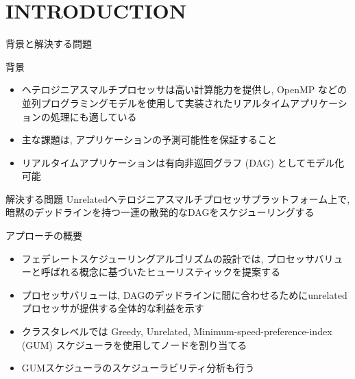 
\section{INTRODUCTION}
\label{sec: introduction}

\begin{frame}{背景と解決する問題}
    \begin{block}{背景}
        \setlength{\linewidth}{0.98\columnwidth}
        \begin{itemize}
            \item ヘテロジニアスマルチプロセッサは高い計算能力を提供し, OpenMP などの並列プログラミングモデルを使用して実装されたリアルタイムアプリケーションの処理にも適している
            \item 主な課題は, アプリケーションの予測可能性を保証すること
            \item リアルタイムアプリケーションは有向非巡回グラフ (DAG) としてモデル化可能
        \end{itemize}
    \end{block}
    \begin{block}{解決する問題}
        Unrelatedヘテロジニアスマルチプロセッサプラットフォーム上で, 暗黙のデッドラインを持つ一連の散発的なDAGをスケジューリングする
    \end{block}
\end{frame}

\begin{frame}{アプローチの概要}
    \begin{itemize}
        \item フェデレートスケジューリングアルゴリズムの設計では, プロセッサバリューと呼ばれる概念に基づいたヒューリスティックを提案する
        \item プロセッサバリューは, DAGのデッドラインに間に合わせるためにunrelatedプロセッサが提供する全体的な利益を示す
        \item クラスタレベルでは Greedy, Unrelated, Minimum-speed-preference-index (GUM) スケジューラを使用してノードを割り当てる
        \item GUMスケジューラのスケジューラビリティ分析も行う
    \end{itemize}
\end{frame}
